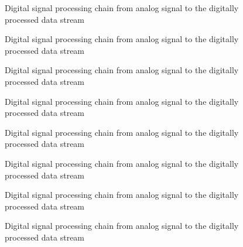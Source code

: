 \begin{figure}
    \centering
    
    \caption{Digital signal processing chain from analog signal to the digitally processed data stream}
    \label{fig:dspChain:blocks}
\end{figure}

\begin{figure}
    \centering
    
    \caption{Digital signal processing chain from analog signal to the digitally processed data stream}
    \label{fig:dspChain:timedomain}
\end{figure}

\begin{figure}
    \centering
    
    \caption{Digital signal processing chain from analog signal to the digitally processed data stream}
    \label{fig:dspChain:freqDomain}
\end{figure}

\begin{figure}
    \centering
    
    \caption{Digital signal processing chain from analog signal to the digitally processed data stream}
    \label{fig:aliasing:band}
\end{figure}

\begin{figure}
    \centering
    
    \caption{Digital signal processing chain from analog signal to the digitally processed data stream}
    \label{fig:aliasing:dirac}
\end{figure}

\begin{figure}
    \centering
    
    \caption{Digital signal processing chain from analog signal to the digitally processed data stream}
    \label{fig:filtertopologies:fir}
\end{figure}

\begin{figure}
    \centering
    
    \caption{Digital signal processing chain from analog signal to the digitally processed data stream}
    \label{fig:filtertopologies:iir}
\end{figure}

\begin{figure}
    \centering
    
    \caption{Digital signal processing chain from analog signal to the digitally processed data stream}
    \label{fig:filtertopologies:cic}
\end{figure}


